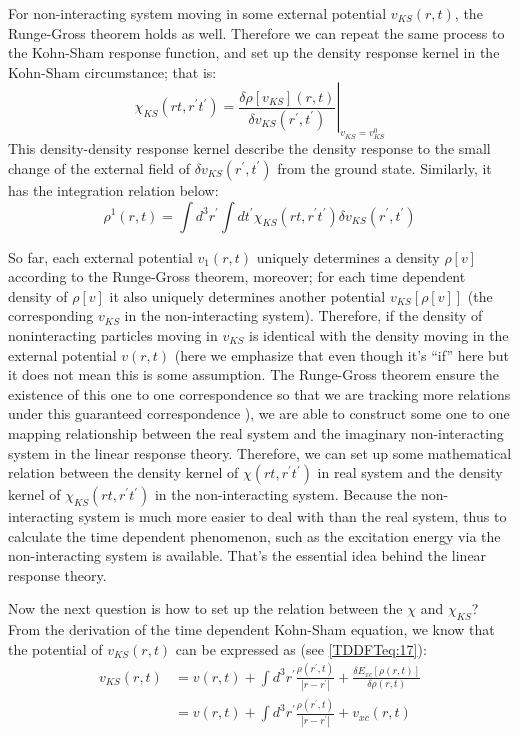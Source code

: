 For non-interacting system moving in some external potential
$v_{KS}(r,t)$, the Runge-Gross theorem holds as well. Therefore we
can repeat the same process to the Kohn-Sham response function, and
set up the density response kernel in the Kohn-Sham circumstance;
that is:
\begin{equation}\label{TDDFTeq:46}
\chi_{KS}(rt,r^{'}t^{'}) =
\left.\frac{\delta\rho[v_{KS}](r,t)}{\delta
v_{KS}(r^{'},t^{'})}\right|_{v_{KS} = v_{KS}^{0}}
\end{equation}
This density-density response kernel describe the density response
to the small change of the external field of $\delta
v_{KS}(r^{'},t^{'})$ from the ground state. Similarly, it has the
integration relation below:
\begin{equation}\label{TDDFTeq:23}
\rho^{1}(r,t) = \int d^{3}r^{'}\int dt^{'}
\chi_{KS}(rt,r^{'}t^{'})\delta v_{KS}(r^{'},t^{'})
\end{equation}

So far, each external potential $v_{1}(r,t)$ uniquely determines a
density $\rho[v]$ according to the Runge-Gross theorem, moreover;
for each time dependent density of $\rho[v]$ it also uniquely
determines another potential $v_{KS}[\rho[v]]$ (the corresponding
$v_{KS}$ in the non-interacting system). Therefore, if the density
of noninteracting particles moving in $v_{KS}$ is identical with the
density moving in the external potential $v(r,t)$ (here we emphasize
that even though it's ``if'' here but it does not mean this is some
assumption. The Runge-Gross theorem ensure the existence of this one
to one correspondence so that we are tracking more relations under
this guaranteed correspondence ), we are able to construct some one
to one mapping relationship between the real system and the
imaginary non-interacting system in the linear response theory.
Therefore, we can set up some mathematical relation between the
density kernel of $\chi(rt,r^{'}t^{'})$ in real system and the
density kernel of $\chi_{KS}(rt,r^{'}t^{'})$ in the non-interacting
system. Because the non-interacting system is much more easier to
deal with than the real system, thus to calculate the time dependent
phenomenon, such as the excitation energy via the non-interacting
system is available. That's the essential idea behind the linear
response theory.

Now the next question is how to set up the relation between the
$\chi$ and $\chi_{KS}$? From the derivation of the time dependent
Kohn-Sham equation, we know that the potential of $v_{KS}(r,t)$ can
be expressed as (see \ref{TDDFTeq:17}):
\begin{align}\label{TDDFTeq:48}
v_{KS}(r,t) &= v(r,t) + \int d^{3}r^{'}\frac{\rho(r^{'},
t)}{|r-r^{'}|} + \frac{\delta E_{xc}[\rho(r,t)]}{\delta\rho(r,t)}
\nonumber \\
&=v(r,t) + \int d^{3}r^{'}\frac{\rho(r^{'}, t)}{|r-r^{'}|} +
v_{xc}(r,t)
\end{align}

